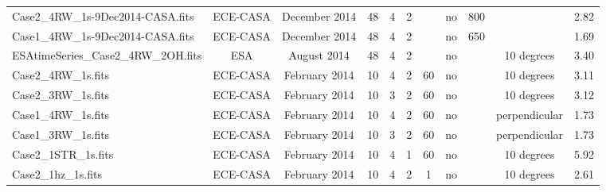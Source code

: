 \documentclass[11pt]{article}      %
\begin{document}
\begin{table}[hb]
\begin{tabular}{| l | c | c | c | c  | c | c | c | c | c | c |}
    Case2\_4RW\_1s-9Dec2014-CASA.fits & ECE-CASA & December 2014 & 48 & 4  & 2 & & no & 800 & & 2.82 \\
    Case1\_4RW\_1s-9Dec2014-CASA.fits & ECE-CASA & December 2014 & 48 & 4  & 2 & & no & 650 & & 1.69 \\
    ESAtimeSeries\_Case2\_4RW\_2OH.fits & ESA & August 2014 & 48 & 4 & 2 & & no & & 10 degrees & 3.40 \\
    Case2\_4RW\_1s.fits & ECE-CASA & February 2014 & 10 & 4 & 2 & 60 & no & & 10 degrees & 3.11 \\
    Case2\_3RW\_1s.fits & ECE-CASA & February 2014 & 10 & 3 & 2 & 60 & no & & 10 degrees & 3.12 \\
    Case1\_4RW\_1s.fits & ECE-CASA & February 2014 & 10 & 4 & 2 & 60 & no & & perpendicular & 1.73 \\
    Case1\_3RW\_1s.fits & ECE-CASA & February 2014 & 10 & 3 & 2 & 60 & no & & perpendicular & 1.73 \\
    Case2\_1STR\_1s.fits & ECE-CASA & February 2014 & 10 & 4 & 1 & 60 & no & & 10 degrees & 5.92 \\
    Case2\_1hz\_1s.fits & ECE-CASA & February 2014 & 10 & 4 & 2 & 1 & no & & 10 degrees & 2.61 \\
    \hline
  \end{tabular}

  \label{tab:jitter}
\end{table}

\fi
\end{document}
